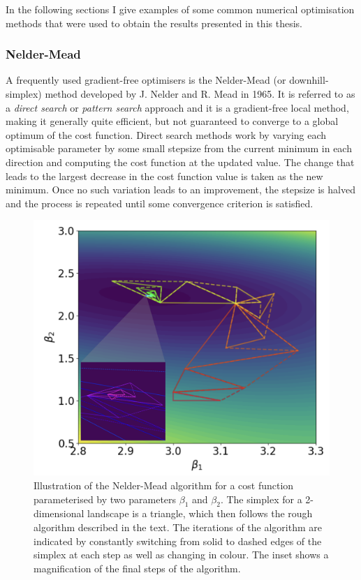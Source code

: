 In the following sections I give examples of some common numerical optimisation methods that were used to obtain the results presented in this thesis.

\subsubsection{Nelder-Mead}\label{sec:3.1.3.1_Nelder_Mead}

A frequently used gradient-free optimisers is the Nelder-Mead (or downhill-simplex) method \cite{nelder_simplex_1965} developed by J. Nelder and R. Mead in 1965. It is referred to as a \emph{direct search} or \emph{pattern search} approach and it is a gradient-free local method, making it generally quite efficient, but not guaranteed to converge to a global optimum of the cost function. Direct search methods work by varying each optimisable parameter by some small stepsize from the current minimum in each direction and computing the cost function at the updated value. The change that leads to the largest decrease in the cost function value is taken as the new minimum. Once no such variation leads to an improvement, the stepsize is halved and the process is repeated until some convergence criterion is satisfied.

\begin{figure}[t]
\centering
\includegraphics[width=0.6\linewidth]{images_v1/nelder_mead_illustration.png} \caption[Visualising the Nelder-Mead optimisation algorithm.]{Illustration of the Nelder-Mead algorithm for a cost function parameterised by two parameters $\beta_1$ and $\beta_2$. The simplex for a 2-dimensional landscape is a triangle, which then follows the rough algorithm described in the text. The iterations of the algorithm are indicated by constantly switching from solid to dashed edges of the simplex at each step as well as changing in colour. The inset shows a magnification of the final steps of the algorithm.}\label{fig:nelder_mead}
\end{figure}

